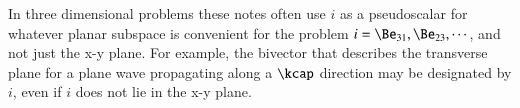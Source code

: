 In three dimensional problems these notes often use \( i \) as a pseudoscalar for whatever planar subspace is convenient for the problem \( i = \Be_{31}, \Be_{23}, \cdots \), and not just the x-y plane.  For example, the bivector that describes the transverse plane for a plane wave propagating along a \( \kcap \) direction may be designated by \( i \), even if \( i \) does not lie in the x-y plane.



